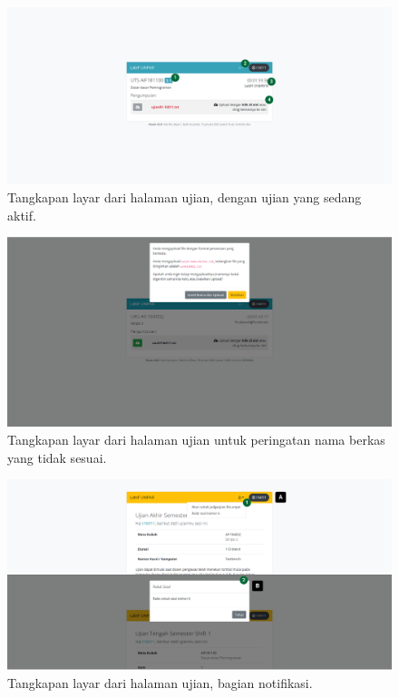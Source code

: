         \begin{figure}
            \centering
            \includegraphics[width=0.7\paperwidth]{Gambar/implemented-interface/peserta/exam-open.png}
            \caption{Tangkapan layar dari halaman ujian, dengan ujian yang sedang aktif.}
            \label{fig:screenshot-peserta-open}
        \end{figure}
        
        \begin{figure}
            \centering
            \includegraphics[width=0.7\paperwidth]{Gambar/implemented-interface/peserta/exam-wrong-filename.png}
            \caption{Tangkapan layar dari halaman ujian untuk peringatan nama berkas yang tidak sesuai.}
            \label{fig:screenshot-peserta-wrong-filename}
        \end{figure}
        
        \begin{figure}
            \centering
            \includegraphics[width=0.7\paperwidth]{Gambar/implemented-interface/peserta/exam-notif.png}
            \caption{Tangkapan layar dari halaman ujian, bagian notifikasi.}
            \label{fig:screenshot-peserta-notification}
        \end{figure}
        
